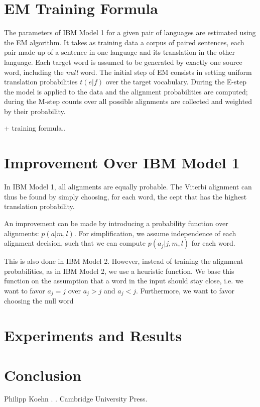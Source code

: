 \documentclass[11pt]{article}
\begin{document}

\section{EM Training Formula}
\label{EM}
The parameters of IBM Model 1 for a given pair of languages are estimated using the EM algorithm. It takes as training data a corpus of paired sentences, each pair made up of a sentence in one language and its translation in the other language. Each target word is assumed to be generated by exactly one source word, including the \textit{null} word. The initial step of EM consists in setting uniform translation probabilities $t(e|f)$ over the target vocabulary. During the E-step the model is applied to the data and the alignment probabilities are computed; during the M-step counts over all possible alignments are collected and weighted by their probability. 

+ training formula..

\section{Improvement Over IBM Model 1}
\label{Improvement}

In IBM Model 1, all alignments are equally probable. The Viterbi alignment can thus be found by simply choosing, for each word, the cept that has the highest translation probability. 

An improvement can be made by introducing a probability function over alignments: $p(a|m,l)$. 
For simplification, we assume independence of each alignment decision, such that we can compute $p(a_j|j,m,l)$ for each word.

This is also done in IBM Model 2. However,  instead of training the alignment probabilities, as in IBM Model 2, we use a heuristic function. We base this function on the assumption that a word in the input should stay close, i.e. we want to favor $a_j=j$ over $a_j>j$ and $a_j<j$. Furthermore, we want to favor choosing the null word %

\section{Experiments and Results}
\label{Eval}

\section{Conclusion}
\label{Concl}

\begin{thebibliography}{}
\bibitem[1]{}
Philipp Koehn
.
.
\newblock Cambridge University Press.

\end{thebibliography}
\end{document}

